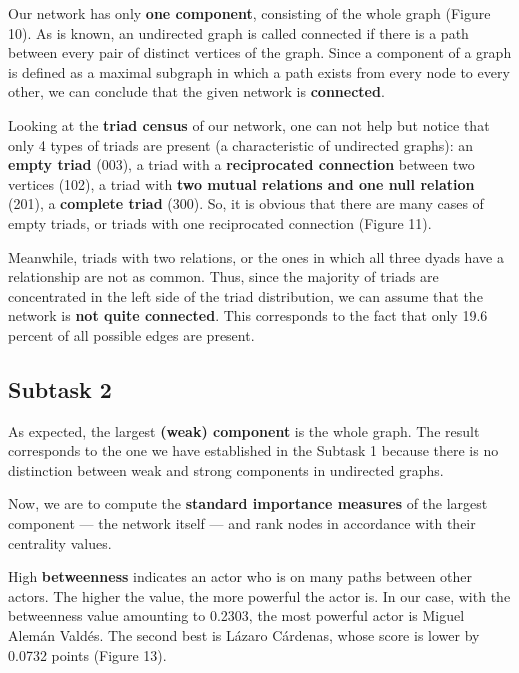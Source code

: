 
Our network has only \textbf{one component}, consisting of the whole graph (Figure 10). As is known, an undirected graph is called connected if there is a path between every pair of distinct vertices of the graph. Since a component of a graph is defined as a maximal subgraph in which a path exists from every node to every other, we can conclude that the given network is \textbf{connected}.


Looking at the \textbf{triad census} of our network, one can not help but notice that only 4 types of triads are present (a characteristic of undirected graphs): an \textbf{empty triad} (003), a triad with a \textbf{reciprocated connection} between two vertices (102), a triad with \textbf{two mutual relations and one null relation} (201), a \textbf{complete triad} (300). So, it is obvious that there are many cases of empty triads, or triads with one reciprocated connection (Figure 11). 

Meanwhile, triads with two relations, or the ones in which all three dyads have a relationship are not as common. Thus, since the majority of triads are concentrated in the left side of the triad distribution, we can assume that the network is \textbf{not quite connected}. This corresponds to the fact that only 19.6 percent of all possible edges are present.

\FloatBarrier
\clearpage


\subsection{Subtask 2}
As expected, the largest \textbf{(weak) component} is the whole graph. The result corresponds to the one we have established in the Subtask 1 because there is no distinction between weak and strong components in undirected graphs.

\FloatBarrier

Now, we are to compute the \textbf{standard importance measures} of the largest component — the network itself — and rank nodes in accordance with their centrality values.

High \textbf{betweenness} indicates an actor who is on many paths between other actors. The higher the value, the more powerful the actor is. In our case, with the betweenness value amounting to 0.2303, the most powerful actor is Miguel Alemán Valdés. The second best is Lázaro Cárdenas, whose score is lower by 0.0732 points (Figure 13).

